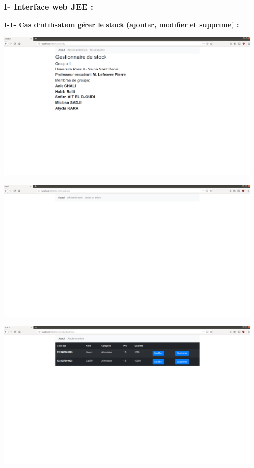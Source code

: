 \documentclass[french,10pt,a4paper]{report}
\begin{document}
\subsubsection{I- Interface web JEE :}
\textbf{I-1- Cas d'utilisation gérer le stock (ajouter, modifier et supprime) :}
\begin{center}
	\includegraphics[scale=0.15]{captures/1.png}
\end{center}
\begin{center}
	\includegraphics[scale=0.15]{captures/2.png}
\end{center}
\begin{center}
	\includegraphics[scale=0.15]{captures/3.png}
\end{center}
\end{document}
